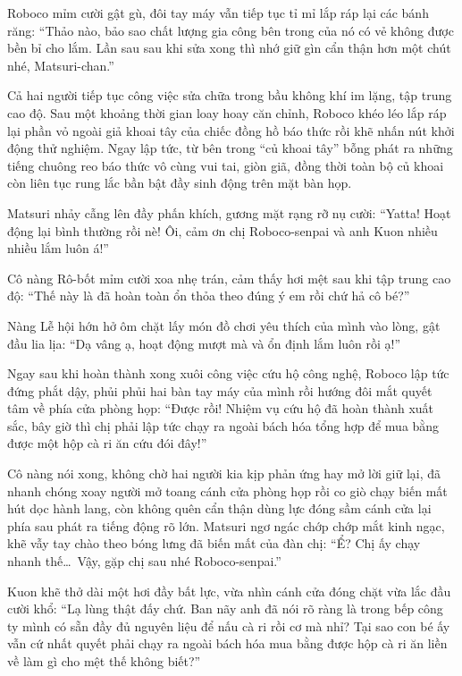 \documentclass[../main.tex]{subfiles}
\begin{document}
Roboco mỉm cười gật gù, đôi tay máy vẫn tiếp tục tỉ mỉ lắp ráp lại các bánh răng: ``Thảo nào, bảo sao chất lượng gia công bên trong của nó có vẻ không được bền bỉ cho lắm. Lần sau sau khi sửa xong thì nhớ giữ gìn cẩn thận hơn một chút nhé, Matsuri-chan.''

Cả hai người tiếp tục công việc sửa chữa trong bầu không khí im lặng, tập trung cao độ. Sau một khoảng thời gian loay hoay căn chỉnh, Roboco khéo léo lắp ráp lại phần vỏ ngoài giả khoai tây của chiếc đồng hồ báo thức rồi khẽ nhấn nút khởi động thử nghiệm. Ngay lập tức, từ bên trong ``củ khoai tây'' bỗng phát ra những tiếng chuông reo báo thức vô cùng vui tai, giòn giã, đồng thời toàn bộ củ khoai còn liên tục rung lắc bần bật đầy sinh động trên mặt bàn họp.

Matsuri nhảy cẫng lên đầy phấn khích, gương mặt rạng rỡ nụ cười: ``Yatta! Hoạt động lại bình thường rồi nè! Ôi, cảm ơn chị Roboco-senpai và anh Kuon nhiều nhiều lắm luôn á!''

Cô nàng Rô-bốt mỉm cười xoa nhẹ trán, cảm thấy hơi mệt sau khi tập trung cao độ: ``Thế này là đã hoàn toàn ổn thỏa theo đúng ý em rồi chứ hả cô bé?''

Nàng Lễ hội hớn hở ôm chặt lấy món đồ chơi yêu thích của mình vào lòng, gật đầu lia lịa: ``Dạ vâng ạ, hoạt động mượt mà và ổn định lắm luôn rồi ạ!''

Ngay sau khi hoàn thành xong xuôi công việc cứu hộ công nghệ, Roboco lập tức đứng phắt dậy, phủi phủi hai bàn tay máy của mình rồi hướng đôi mắt quyết tâm về phía cửa phòng họp: ``Được rồi! Nhiệm vụ cứu hộ đã hoàn thành xuất sắc, bây giờ thì chị phải lập tức chạy ra ngoài bách hóa tổng hợp để mua bằng được một hộp cà ri ăn cứu đói đây!''


Cô nàng nói xong, không chờ hai người kia kịp phản ứng hay mở lời giữ lại, đã nhanh chóng xoay người mở toang cánh cửa phòng họp rồi co giò chạy biến mất hút dọc hành lang, còn không quên cẩn thận dùng lực đóng sầm cánh cửa lại phía sau phát ra tiếng động rõ lớn. Matsuri ngơ ngác chớp chớp mắt kinh ngạc, khẽ vẫy tay chào theo bóng lưng đã biến mất của đàn chị: ``Ể? Chị ấy chạy nhanh thế\dots\ Vậy, gặp chị sau nhé Roboco-senpai.''

Kuon khẽ thở dài một hơi đầy bất lực, vừa nhìn cánh cửa đóng chặt vừa lắc đầu cười khổ: ``Lạ lùng thật đấy chứ. Ban nãy anh đã nói rõ ràng là trong bếp công ty mình có sẵn đầy đủ nguyên liệu để nấu cà ri rồi cơ mà nhỉ? Tại sao con bé ấy vẫn cứ nhất quyết phải chạy ra ngoài bách hóa mua bằng được hộp cà ri ăn liền về làm gì cho mệt thế không biết?''
\end{document}
